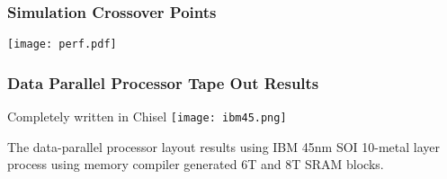 \documentclass[xcolor=pdflatex,dvipsnames,table]{beamer}
\begin{document}
\ifx\poster\undefined
\begin{frame}
\frametitle{Simulation Crossover Points}

% 

\begin{center}
\texttt{[image: perf.pdf]}
\end{center}


\end{frame}
\fi

\begin{frame}[fragile]
\frametitle{Data Parallel Processor Tape Out Results}

\begin{center}
Completely written in Chisel
\texttt{[image: ibm45.png]}

\begin{footnotesize}
The data-parallel processor layout results using IBM 45nm SOI 10-metal layer process using memory compiler generated 6T and 8T SRAM blocks.
\end{footnotesize}
\end{center}

\end{frame}
\end{document}
